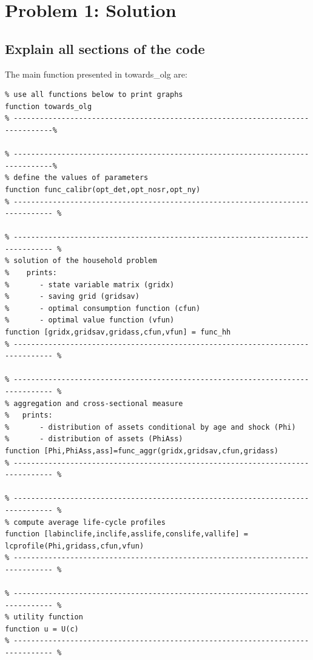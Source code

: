\documentclass[12pt,a4paper]{article}
\begin{document}
\newpage


\section*{Problem 1: Solution}

\subsection*{Explain all sections of the code}

The main function presented in {\selectfont towards\_olg} are:

\begin{lstlisting}[frame=single]
% -------------------------------------------------------------------------------%
% use all functions below to print graphs
function towards_olg
% -------------------------------------------------------------------------------%

% -------------------------------------------------------------------------------%
% define the values of parameters
function func_calibr(opt_det,opt_nosr,opt_ny)
% ------------------------------------------------------------------------------- %

% ------------------------------------------------------------------------------- %
% solution of the household problem
%    prints:
%       - state variable matrix (gridx)
%       - saving grid (gridsav)
%       - optimal consumption function (cfun)
%       - optimal value function (vfun)
function [gridx,gridsav,gridass,cfun,vfun] = func_hh
% ------------------------------------------------------------------------------- %

% ------------------------------------------------------------------------------- %
% aggregation and cross-sectional measure
%   prints:
%       - distribution of assets conditional by age and shock (Phi)
%       - distribution of assets (PhiAss)
function [Phi,PhiAss,ass]=func_aggr(gridx,gridsav,cfun,gridass)
% ------------------------------------------------------------------------------- %

% ------------------------------------------------------------------------------- %
% compute average life-cycle profiles
function [labinclife,inclife,asslife,conslife,vallife] = lcprofile(Phi,gridass,cfun,vfun)
% ------------------------------------------------------------------------------- %

% ------------------------------------------------------------------------------- %
% utility function
function u = U(c)
% ------------------------------------------------------------------------------- %
\end{lstlisting}
\end{document}
